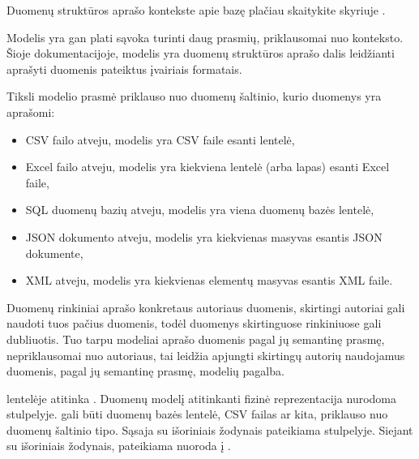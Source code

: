 \documentclass[letterpaper,10pt,lithuanian]{sphinxmanual}
\begin{document}
\begin{description}
\sphinxAtStartPar
Duomenų struktūros aprašo kontekste apie bazę plačiau skaitykite
skyriuje {\hyperref[\detokenize{dimensijos:base}]{}}.

\sphinxAtStartPar
Modelis yra gan plati sąvoka turinti daug prasmių, priklausomai nuo
konteksto. Šioje dokumentacijoje, modelis yra duomenų struktūros
aprašo dalis leidžianti aprašyti duomenis pateiktus įvairiais
formatais.

\sphinxAtStartPar
Tiksli modelio prasmė priklauso nuo duomenų šaltinio, kurio duomenys
yra aprašomi:
\begin{itemize}
\item {} 
\sphinxAtStartPar
CSV failo atveju, modelis yra CSV faile esanti lentelė,

\item {} 
\sphinxAtStartPar
Excel failo atveju, modelis yra kiekviena lentelė (arba lapas) esanti
Excel faile,

\item {} 
\sphinxAtStartPar
SQL duomenų bazių atveju, modelis yra viena duomenų bazės lentelė,

\item {} 
\sphinxAtStartPar
JSON dokumento atveju, modelis yra kiekvienas masyvas esantis JSON
dokumente,

\item {} 
\sphinxAtStartPar
XML atveju, modelis yra kiekvienas elementų masyvas esantis XML faile.

\end{itemize}

\sphinxAtStartPar
Duomenų rinkiniai aprašo konkretaus autoriaus duomenis, skirtingi
autoriai gali naudoti tuos pačius duomenis, todėl duomenys skirtinguose
rinkiniuose gali dubliuotis. Tuo tarpu modeliai aprašo duomenis pagal
jų semantinę prasmę, nepriklausomai nuo autoriaus, tai leidžia apjungti
skirtingų autorių naudojamus duomenis, pagal jų semantinę prasmę,
modelių pagalba.

\sphinxAtStartPar
{\hyperref[\detokenize{savokos:term-DSA}]{}} lentelėje atitinka {\hyperref[\detokenize{formatas:model}]{}}. Duomenų modelį atitinkanti
fizinė reprezentacija nurodoma {\hyperref[\detokenize{formatas:source}]{}} stulpelyje. {\hyperref[\detokenize{formatas:source}]{}}
gali būti duomenų bazės lentelė, CSV failas ar kita, priklauso nuo
duomenų šaltinio tipo. Sąsaja su išoriniais žodynais pateikiama
{\hyperref[\detokenize{formatas:uri}]{}} stulpelyje. Siejant su išoriniais žodynais, pateikiama
nuoroda į .


\end{description}
\end{document}
